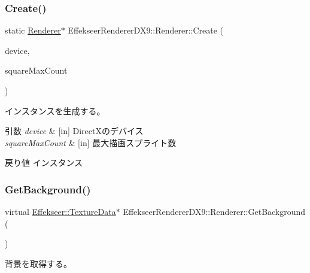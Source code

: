 \subsubsection{\texorpdfstring{Create()}{Create()}}
{\footnotesize\ttfamily static \mbox{\hyperlink{class_effekseer_renderer_d_x9_1_1_renderer}{Renderer}}$\ast$ Effekseer\+Renderer\+D\+X9\+::\+Renderer\+::\+Create (\begin{DoxyParamCaption}\item[{L\+P\+D\+I\+R\+E\+C\+T3\+D\+D\+E\+V\+I\+C\+E9}]{device,  }\item[{int32\+\_\+t}]{square\+Max\+Count }\end{DoxyParamCaption})\hspace{0.3cm}{\ttfamily [static]}}



インスタンスを生成する。 


\begin{DoxyParams}{引数}
{\em device} & \mbox{[}in\mbox{]} Direct\+Xのデバイス \\
\hline
{\em square\+Max\+Count} & \mbox{[}in\mbox{]} 最大描画スプライト数 \\
\hline
\end{DoxyParams}
\begin{DoxyReturn}{戻り値}
インスタンス 
\end{DoxyReturn}
\mbox{\label{class_effekseer_renderer_d_x9_1_1_renderer_a98f5bc52650df1982e9fb75b3c735d65}} 
\subsubsection{\texorpdfstring{Get\+Background()}{GetBackground()}}
{\footnotesize\ttfamily virtual \mbox{\hyperlink{struct_effekseer_1_1_texture_data}{Effekseer\+::\+Texture\+Data}}$\ast$ Effekseer\+Renderer\+D\+X9\+::\+Renderer\+::\+Get\+Background (\begin{DoxyParamCaption}{ }\end{DoxyParamCaption})\hspace{0.3cm}{\ttfamily [pure virtual]}}



背景を取得する。 

\mbox{\label{class_effekseer_renderer_d_x9_1_1_renderer_a41c5637f9dcf5341d12b9b61ee46bd74}} 
